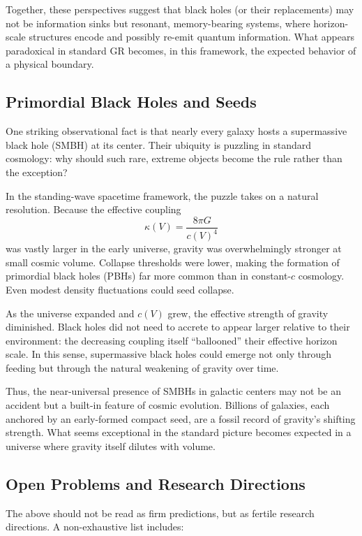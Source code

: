 \documentclass[12pt]{article}
\begin{document}
Together, these perspectives suggest that black holes (or their replacements) may not be information sinks but resonant, memory-bearing systems, where horizon-scale structures encode and possibly re-emit quantum information. What appears paradoxical in standard GR becomes, in this framework, the expected behavior of a physical boundary.

\subsection{Primordial Black Holes and Seeds}

One striking observational fact is that nearly every galaxy hosts a supermassive black hole (SMBH) at its center. Their ubiquity is puzzling in standard cosmology: why should such rare, extreme objects become the rule rather than the exception?

In the standing-wave spacetime framework, the puzzle takes on a natural resolution. Because the effective coupling 
\[
\kappa(V) = \frac{8\pi G}{c(V)^4}
\]
was vastly larger in the early universe, gravity was overwhelmingly stronger at small cosmic volume. Collapse thresholds were lower, making the formation of primordial black holes (PBHs) far more common than in constant-$c$ cosmology. Even modest density fluctuations could seed collapse.

As the universe expanded and $c(V)$ grew, the effective strength of gravity diminished. Black holes did not need to accrete to appear larger relative to their environment: the decreasing coupling itself ``ballooned'' their effective horizon scale. In this sense, supermassive black holes could emerge not only through feeding but through the natural weakening of gravity over time.

Thus, the near-universal presence of SMBHs in galactic centers may not be an accident but a built-in feature of cosmic evolution. Billions of galaxies, each anchored by an early-formed compact seed, are a fossil record of gravity’s shifting strength. What seems exceptional in the standard picture becomes expected in a universe where gravity itself dilutes with volume.

\subsection{Open Problems and Research Directions}

The above should not be read as firm predictions, but as fertile research directions. A non-exhaustive list includes:
\end{document}
